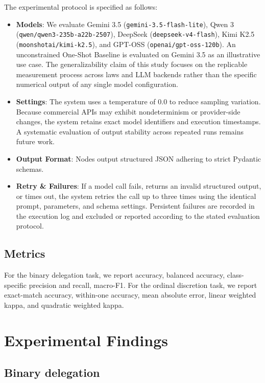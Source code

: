 \documentclass[conference]{IEEEtran}
\begin{document}
The experimental protocol is specified as follows:
\begin{itemize}[nosep]
    \raggedright
    \item \textbf{Models}: We evaluate Gemini 3.5 (\texttt{gemini-3.5-flash-lite}), Qwen 3 (\texttt{qwen/qwen3-235b-a22b-2507}), DeepSeek (\texttt{deepseek-v4-flash}), Kimi K2.5 (\texttt{moonshotai/kimi-k2.5}), and GPT-OSS (\texttt{openai/gpt-oss-120b}). An unconstrained One-Shot Baseline is evaluated on Gemini 3.5 as an illustrative use case. The generalizability claim of this study focuses on the replicable measurement process across laws and LLM backends rather than the specific numerical output of any single model configuration.
    \item \textbf{Settings}: The system uses a temperature of 0.0 to reduce sampling variation. Because commercial APIs may exhibit nondeterminism or provider-side changes, the system retains exact model identifiers and execution timestamps. A systematic evaluation of output stability across repeated runs remains future work.
    \item \textbf{Output Format}: Nodes output structured JSON adhering to strict Pydantic schemas.
    \item \textbf{Retry \& Failures}: If a model call fails, returns an invalid structured output, or times out, the system retries the call up to three times using the identical prompt, parameters, and schema settings. Persistent failures are recorded in the execution log and excluded or reported according to the stated evaluation protocol.
\end{itemize}


\subsection{Metrics}

For the binary delegation task, we report accuracy, balanced accuracy, class-specific precision and recall, macro-F1. For the ordinal discretion task, we report exact-match accuracy, within-one accuracy, mean absolute error, linear weighted kappa, and quadratic weighted kappa.

\section{Experimental Findings}

\subsection{Binary delegation}
\end{document}
